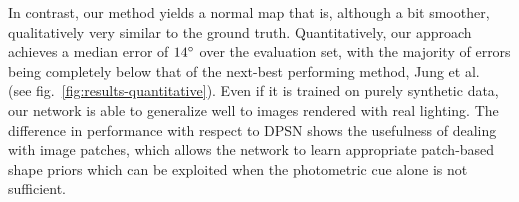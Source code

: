 In contrast, our method yields a normal map that is, although a bit smoother, qualitatively very similar to the ground truth. Quantitatively, our approach achieves a median error of $14^{\circ}$ over the evaluation set, with the majority of errors being completely below that of the next-best performing method, Jung et al.~\cite{jung-cvpr-15} (see fig.~\ref{fig:results-quantitative}). Even if it is trained on purely synthetic data, our network is able to generalize well to images rendered with real lighting. The difference in performance with respect to DPSN shows the usefulness of dealing with image patches, which allows the network to learn appropriate patch-based shape priors which can be exploited when the photometric cue alone is not sufficient. 









